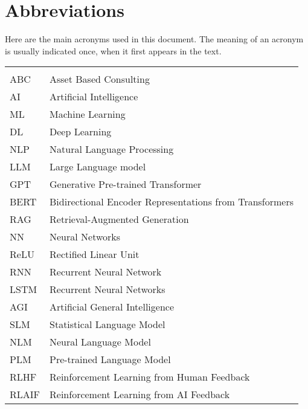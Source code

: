 \chapter*{Abbreviations}

Here are the main acronyms used in this document. The meaning of an acronym is usually indicated once, when it first appears in the text.

\begin{longtable}{lp{9cm}}
          &                                                         \\
    ABC   & Asset Based Consulting                                  \\
    AI    & Artificial Intelligence                                 \\
    ML    & Machine Learning                                        \\
    DL    & Deep Learning                                           \\
    NLP   & Natural Language Processing                             \\
    LLM   & Large Language model                                    \\
    GPT   & Generative Pre-trained Transformer                      \\
    BERT  & Bidirectional Encoder Representations from Transformers \\
    RAG   & Retrieval-Augmented Generation                          \\
    NN    & Neural Networks                                         \\
    ReLU  & Rectified Linear Unit                                   \\
    RNN   & Recurrent Neural Network                                \\
    LSTM  & Recurrent Neural Networks                               \\
    AGI   & Artificial General Intelligence                         \\
    SLM   & Statistical Language Model                              \\
    NLM   & Neural Language Model                                   \\
    PLM   & Pre-trained Language Model                              \\
    RLHF  & Reinforcement Learning from Human Feedback              \\
    RLAIF & Reinforcement Learning from AI Feedback                 \\
\end{longtable}

